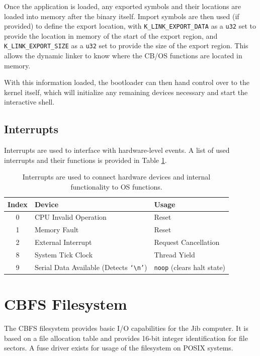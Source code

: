 \documentclass{article}
\begin{document}
Once the application is loaded, any exported symbols and their locations are loaded into memory after the binary itself. Import symbols are then used (if provided) to define the export location, with \texttt{K\_LINK\_EXPORT\_DATA} as a \texttt{u32} set to provide the location in memory of the start of the export region, and \texttt{K\_LINK\_EXPORT\_SIZE} as a \texttt{u32} set to provide the size of the export region. This allows the dynamic linker to know where the CB/OS functions are located in memory.

With this information loaded, the bootloader can then hand control over to the kernel itself, which will initialize any remaining devices necessary and start the interactive shell.

\subsection{Interrupts}

Interrupts are used to interface with hardware-level events. A list of used interrupts and their functions is provided in Table \ref{table:cbos-interrupt-table}.

\begin{table}[h!]
	\centering
	\begin{tabular}{c|ll}
		\hline
		Index & Device & Usage \\
		\hline
		0 & CPU Invalid Operation & Reset \\
		1 & Memory Fault & Reset \\
		2 & External Interrupt &  Request Cancellation \\
		8 & System Tick Clock & Thread Yield \\
		9 & Serial Data Available (Detects \texttt{`\textbackslash n'}) & \texttt{noop} (clears halt state) \\

		\hline
	\end{tabular}
	\caption{Interrupts are used to connect hardware devices and internal functionality to OS functions.}
	\label{table:cbos-interrupt-table}
\end{table}

\pagebreak

\section{CBFS Filesystem}
\label{sec:cbfs}

The CBFS filesystem provides basic I/O capabilities for the Jib computer. It is based on a file allocation table and provides 16-bit integer identification for file sectors. A fuse driver exists for usage of the filesystem on POSIX systems.
\end{document}
